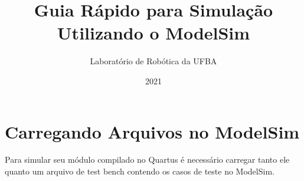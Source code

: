 \documentclass[12pt]{article}
\begin{document}
\title{Guia Rápido para Simulação Utilizando o ModelSim}

\author{Laboratório de Robótica da UFBA}

\date{2021}

\maketitle

\setcounter{page}{1} %

\section{Carregando Arquivos no ModelSim}
Para simular seu módulo compilado no Quartus é necessário carregar tanto ele quanto um arquivo de test bench contendo os casos de teste no ModelSim.
\end{document}
